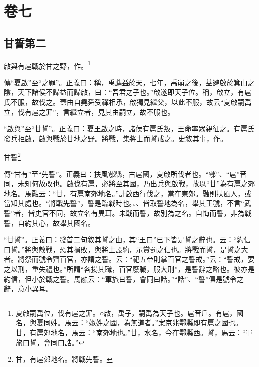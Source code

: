 

\chapter{卷七}

\section{甘誓第二}

啟與有扈戰於甘之野，作。\footnote{夏啟嗣禹位，伐有扈之罪。○啟，禹子，嗣禹為天子也。扈音戶。有扈，國名，與夏同姓。馬云：“姒姓之國，為無道者。”案京兆鄠縣即有扈之國也。甘，有扈郊地名，馬云：“南郊地也。”甘，水名，今在鄠縣西。誓，馬云：“軍旅曰誓，會同曰誥。”}

{\noindent\zhuan{}\fzbyks 傳“夏啟”至“之罪”。正義曰：稱，禹薦益於天，七年，禹崩之後，益避啟於箕山之陰，天下諸侯不歸益而歸啟，曰：“吾君之子也。”啟遂即天子位。稱，啟立，有扈氏不服，故伐之。蓋由自堯舜受禪相承，啟獨見繼父，以此不服，故云“夏啟嗣禹立，伐有扈之罪”，言繼立者，見其由嗣立，故不服也。 \par}

{\noindent\shu{}\fzkt “啟與”至“甘誓”。正義曰：夏王啟之時，諸侯有扈氏叛，王命率眾親征之。有扈氏發兵拒啟，啟與戰於甘地之野。將戰，集將士而誓戒之。史敘其事，作。 \par}

甘誓\footnote{甘，有扈郊地名。將戰先誓。}

{\noindent\zhuan{}\fzbyks 傳“甘有”至“先誓”。正義曰：扶風鄠縣，古扈國，夏啟所伐者也。“鄠”、“扈”音同，未知何故改也。啟伐有扈，必將至其國，乃出兵與啟戰，故以“甘”為有扈之郊地名。馬融云：“甘，有扈南郊地名。”計啟西行伐之，當在東郊。融則扶風人，或當知其處也。“將戰先誓”，誓是臨戰時也。、、皆取誓地為名，舉其王號，不言“武誓”者，皆史官不同，故立名有異耳。未戰而誓，故別為之名。自悔而誓，非為戰誓，自約其心，故舉其國名。 \par}

{\noindent\shu{}\fzkt “甘誓”。正義曰：發首二句敘其誓之由，其“王曰”已下皆是誓之辭也。云：“約信曰誓。”將與敵戰，恐其損敗，與將士設約，示賞罰之信也。將戰而誓，是誓之大者。將祭而號令齊百官，亦謂之誓。云：“祀五帝則掌百官之誓戒。”云：“誓戒，要之以刑，重失禮也。”所謂“各揚其職，百官廢職，服大刑”，是誓辭之略也。彼亦是約信，但小於戰之誓。馬融云：“軍旅曰誓，會同曰誥。”“誥”、“誓”俱是號令之辭，意小異耳。 \par}

